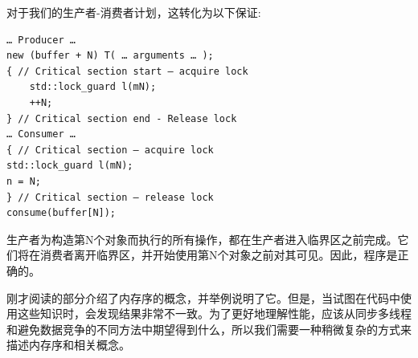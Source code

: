 对于我们的生产者-消费者计划，这转化为以下保证:

\begin{lstlisting}[style=styleCXX]
… Producer …
new (buffer + N) T( … arguments … );
{ // Critical section start – acquire lock
	std::lock_guard l(mN);
	++N;
} // Critical section end - Release lock
… Consumer …
{ // Critical section – acquire lock
std::lock_guard l(mN);
n = N;
} // Critical section – release lock
consume(buffer[N]);
\end{lstlisting}

生产者为构造第N个对象而执行的所有操作，都在生产者进入临界区之前完成。它们将在消费者离开临界区，并开始使用第N个对象之前对其可见。因此，程序是正确的。

刚才阅读的部分介绍了内存序的概念，并举例说明了它。但是，当试图在代码中使用这些知识时，会发现结果非常不一致。为了更好地理解性能，应该从同步多线程和避免数据竞争的不同方法中期望得到什么，所以我们需要一种稍微复杂的方式来描述内存序和相关概念。




































